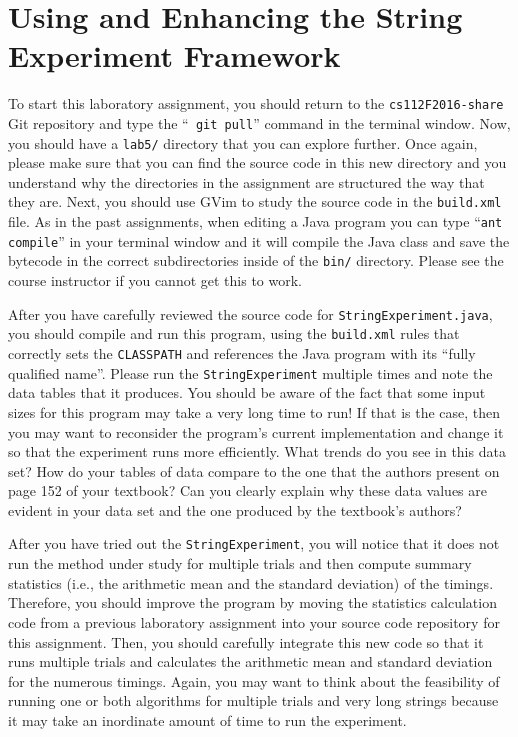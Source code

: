 \section*{Using and Enhancing the String Experiment Framework}

To start this laboratory assignment, you should return to the {\tt cs112F2016-share} Git repository and type the ``{\tt
git pull}'' command in the terminal window.  Now, you should have a {\tt lab5/} directory that you can explore further.
Once again, please make sure that you can find the source code in this new directory and you understand why the
directories in the assignment are structured the way that they are. Next, you should use GVim to study the source code
in the {\tt build.xml} file.  As in the past assignments, when editing a Java program you can type ``{\tt ant compile}''
in your terminal window and it will compile the Java class and save the bytecode in the correct subdirectories inside of
the {\tt bin/} directory. Please see the course instructor if you cannot get this to work.

After you have carefully reviewed the source code for {\tt StringExperiment.java}, you should compile and run this
program, using the {\tt build.xml} rules that correctly sets the {\tt CLASSPATH} and references the Java program with
its ``fully qualified name''. Please run the {\tt StringExperiment} multiple times and note the data tables that it
produces. You should be aware of the fact that some input sizes for this program may take a very long time to run! If
that is the case, then you may want to reconsider the program's current implementation and change it so that the
experiment runs more efficiently. What trends do you see in this data set? How do your tables of data compare to the one
that the authors present on page 152 of your textbook? Can you clearly explain why these data values are evident in your
data set and the one produced by the textbook's authors?

After you have tried out the {\tt StringExperiment}, you will notice that it does not run the method under study for
multiple trials and then compute summary statistics (i.e., the arithmetic mean and the standard deviation) of the
timings. Therefore, you should improve the program by moving the statistics calculation code from a previous laboratory
assignment into your source code repository for this assignment.  Then, you should carefully integrate this new code so
that it runs multiple trials and calculates the arithmetic mean and standard deviation for the numerous timings. Again,
you may want to think about the feasibility of running one or both algorithms for multiple trials and very long strings
because it may take an inordinate amount of time to run the experiment.

